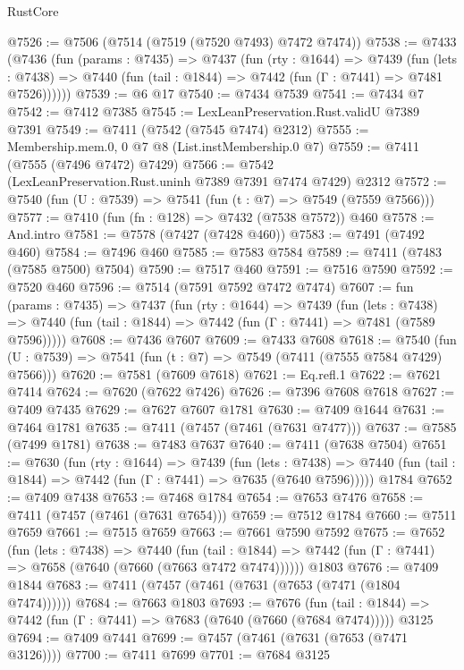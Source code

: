\begin{lexlean}{RustCore}
\begin{coremodule}
@7526 := @7506 (@7514 (@7519 (@7520 @7493) @7472 @7474))
@7538 := @7433
    (@7436
      (fun (params : @7435) =>
      @7437
        (fun (rty : @1644) =>
        @7439
          (fun (lets : @7438) =>
          @7440 (fun (tail : @1844) => @7442 (fun (Γ : @7441) => @7481 @7526))))))
@7539 := @6 @17
@7540 := @7434 @7539
@7541 := @7434 @7
@7542 := @7412 @7385
@7545 := LexLeanPreservation.Rust.validU @7389 @7391
@7549 := @7411 (@7542 (@7545 @7474) @2312)
@7555 := Membership.mem.{0, 0} @7 @8 (List.instMembership.{0} @7)
@7559 := @7411 (@7555 (@7496 @7472) @7429)
@7566 := @7542 (LexLeanPreservation.Rust.uninh @7389 @7391 @7474 @7429) @2312
@7572 := @7540 (fun (U : @7539) => @7541 (fun (t : @7) => @7549 (@7559 @7566)))
@7577 := @7410 (fun (fn : @128) => @7432 (@7538 @7572)) @460
@7578 := And.intro
@7581 := @7578 (@7427 (@7428 @460))
@7583 := @7491 (@7492 @460)
@7584 := @7496 @460
@7585 := @7583 @7584
@7589 := @7411 (@7483 (@7585 @7500) @7504)
@7590 := @7517 @460
@7591 := @7516 @7590
@7592 := @7520 @460
@7596 := @7514 (@7591 @7592 @7472 @7474)
@7607 := fun (params : @7435) =>
  @7437
    (fun (rty : @1644) =>
    @7439
      (fun (lets : @7438) =>
      @7440 (fun (tail : @1844) => @7442 (fun (Γ : @7441) => @7481 (@7589 @7596)))))
@7608 := @7436 @7607
@7609 := @7433 @7608
@7618 := @7540 (fun (U : @7539) => @7541 (fun (t : @7) => @7549 (@7411 (@7555 @7584 @7429) @7566)))
@7620 := @7581 (@7609 @7618)
@7621 := Eq.refl.{1}
@7622 := @7621 @7414
@7624 := @7620 (@7622 @7426)
@7626 := @7396 @7608 @7618
@7627 := @7409 @7435
@7629 := @7627 @7607 @1781
@7630 := @7409 @1644
@7631 := @7464 @1781
@7635 := @7411 (@7457 (@7461 (@7631 @7477)))
@7637 := @7585 (@7499 @1781)
@7638 := @7483 @7637
@7640 := @7411 (@7638 @7504)
@7651 := @7630
    (fun (rty : @1644) =>
    @7439
      (fun (lets : @7438) =>
      @7440 (fun (tail : @1844) => @7442 (fun (Γ : @7441) => @7635 (@7640 @7596)))))
    @1784
@7652 := @7409 @7438
@7653 := @7468 @1784
@7654 := @7653 @7476
@7658 := @7411 (@7457 (@7461 (@7631 @7654)))
@7659 := @7512 @1784
@7660 := @7511 @7659
@7661 := @7515 @7659
@7663 := @7661 @7590 @7592
@7675 := @7652
    (fun (lets : @7438) =>
    @7440
      (fun (tail : @1844) => @7442 (fun (Γ : @7441) => @7658 (@7640 (@7660 (@7663 @7472 @7474))))))
    @1803
@7676 := @7409 @1844
@7683 := @7411 (@7457 (@7461 (@7631 (@7653 (@7471 (@1804 @7474))))))
@7684 := @7663 @1803
@7693 := @7676
    (fun (tail : @1844) => @7442 (fun (Γ : @7441) => @7683 (@7640 (@7660 (@7684 @7474)))))
    @3125
@7694 := @7409 @7441
@7699 := @7457 (@7461 (@7631 (@7653 (@7471 @3126))))
@7700 := @7411 @7699
@7701 := @7684 @3125

\end{coremodule}
\end{lexlean}
